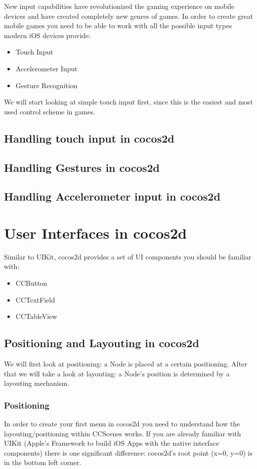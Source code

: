 \documentclass{scrreprt}
\newcommand{\cocos}{cocos2d}
\begin{document}
New input capabilities have revolutionized the gaming experience on mobile
devices and have created completely new genres of games. In order to create
great mobile games you need to be able to work with all the possible input types
modern iOS devices provide:
\begin{itemize}
  \item Touch Input
  \item Accelerometer Input
  \item Gesture Recognition
\end{itemize}
We will start looking at simple touch input first, since this is the easiest and
most used control scheme in games.
\section{Handling touch input in \cocos{}}
\section{Handling Gestures in \cocos{}}
\section{Handling Accelerometer input in \cocos{}}

\chapter{User Interfaces in \cocos{}}
Similar to UIKit, \cocos{} provides a set of UI components you should be
familiar with:
\begin{itemize}
  \item CCButton
  \item CCTextField
  \item CCTableView
\end{itemize}

\section{Positioning and Layouting in \cocos{}}
We will first look at positioning: a Node is placed at a certain positioning.
After that we will take a look at layouting: a Node's position is determined by
a layouting mechanism.
\subsection{Positioning}
In order to create your first menu in \cocos{} you need to understand how the
layouting/positioning within CCScenes works. If you are already
familiar with UIKit (Apple's Framework to build iOS Apps with the native
interface components) there is one significant difference: \cocos{}'s root point
(x=0, y=0) is in the bottom left corner.
\end{document}
